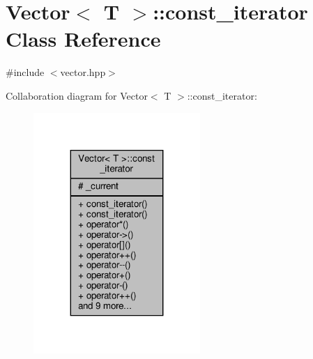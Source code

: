 \hypertarget{classVector_1_1const__iterator}{}\section{Vector$<$ T $>$\+:\+:const\+\_\+iterator Class Reference}
\label{classVector_1_1const__iterator}


{\ttfamily \#include $<$vector.\+hpp$>$}



Collaboration diagram for Vector$<$ T $>$\+:\+:const\+\_\+iterator\+:\nopagebreak
\begin{figure}[H]
\begin{center}
\leavevmode
\includegraphics[width=179pt]{classVector_1_1const__iterator__coll__graph}
\end{center}
\end{figure}
